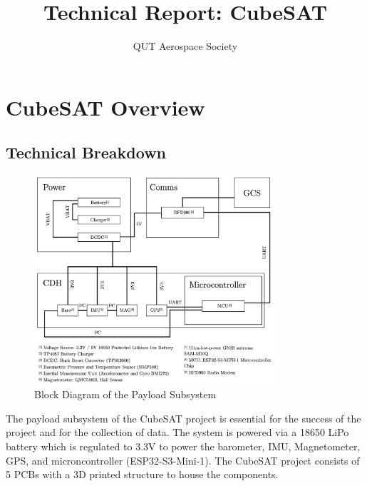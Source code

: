 \documentclass{report}
\author{QUT Aerospace Society}
\title{Technical Report: CubeSAT}
\begin{document}
    
    \maketitle
    \tableofcontents
    \chapter{CubeSAT Overview}
        \section{Technical Breakdown}
            \begin{figure}[H]
                \centering
                \includegraphics[width=0.8\textwidth]{figures/CUBESAD.png}
                \caption{Block Diagram of the Payload Subsystem}
                \label{fig:payload}
            \end{figure}
            The payload subsystem of the CubeSAT project is essential for the success
            of the project and for the collection of data.
            The system is powered via a 18650 LiPo battery which is regulated to 3.3V 
            to power the barometer, IMU, Magnetometer, GPS, and microncontroller (ESP32-S3-Mini-1).
            The CubeSAT project consists of 5 PCBs with a 3D printed structure to house the components.
\end{document}

